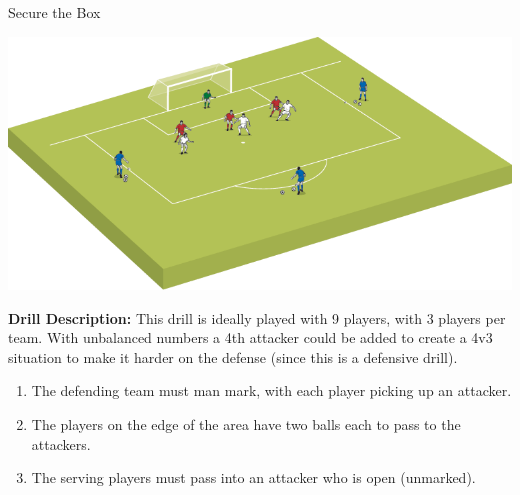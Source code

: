 \begin{evenBlock}{Secure the Box}

\begin{minipage}[t]{\linewidth}
    \centering
    
    \begin{minipage}{.3\linewidth} %
        \includegraphics[width=\textwidth]{../img/Trimmed/SecureTheBox1}
    \end{minipage}
    \hspace{0.05\linewidth}
    \begin{minipage}{.6\linewidth} %
        \textbf{Drill Description:}
        This drill is ideally played with 9 players, with 3 players per team.  With unbalanced numbers a 4th attacker could be added to create a 4v3 situation to make it harder on the defense (since this is a defensive drill).
        \begin{enumerate}
            \setlength{\itemsep}{0pt}
            \setlength{\parskip}{0pt}
            \setlength{\parsep}{0pt}
            \item The defending team must man mark, with each player picking up an attacker.
            \item The players on the edge of the area have two balls each to pass to the attackers.
            \item The serving players must pass into an attacker who is open (unmarked).
        \end{enumerate}
    \end{minipage}
\end{minipage}
\vspace{12pt}


\end{evenBlock}
